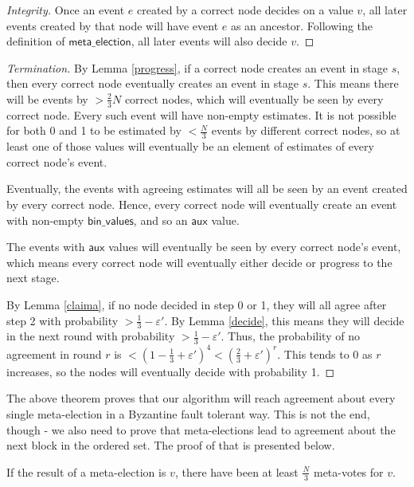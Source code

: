 \documentclass[a4paper,fleqn]{article}
\begin{document}
\begin{proof}[Integrity]
	Once an event $e$ created by a correct node decides on a value $v$, all later events created by
	that node will have event $e$ as an ancestor. Following the definition of
	$\mathsf{meta\_election}$, all later events will also decide $v$.
\end{proof}

\begin{proof}[Termination]
	By Lemma \ref{progress}, if a correct node creates an event in stage $s$, then every correct
	node eventually creates an event in stage $s$. This means there will be events by 
	$> \frac{2}{3}N$ correct nodes, which will eventually be seen by every correct node.  Every
	such event will have non-empty estimates. It is not possible for both 0 and 1 to be estimated
	by $< \frac{N}{3}$ events by different correct nodes, so at least one of those values will
	eventually be an element of estimates of every correct node's event.
	
	Eventually, the events with agreeing estimates will all be seen by an event created by every
	correct node. Hence, every correct node will eventually create an event with non-empty
	$\mathsf{bin\_values}$, and so an $\mathsf{aux}$ value.

	The events with $\mathsf{aux}$ values will eventually be seen by every correct node's event,
	which means every correct node will eventually either decide or progress to the next stage.

	By Lemma \ref{claima}, if no node decided in step 0 or 1, they will all agree after step 2 with
	probability $> \frac{1}{3} - \varepsilon'$. By Lemma \ref{decide}, this means they will decide
	in the next round with probability $> \frac{1}{3} - \varepsilon'$. Thus, the probability of no
	agreement in round $r$ is $< \left( 1 - \frac{1}{3} + \varepsilon' \right)^4 < 
	\left(\frac{2}{3} + \varepsilon'\right)^r$. This tends to 0 as $r$ increases, so the nodes will
	eventually decide with probability 1.
\end{proof}

The above theorem proves that our algorithm will reach agreement about every single meta-election
in a Byzantine fault tolerant way. This is not the end, though - we also need to prove that
meta-elections lead to agreement about the next block in the ordered set. The proof of that is
presented below.

\begin{lem}\label{minvotes}
	If the result of a meta-election is $v$, there have been at least $\frac{N}{3}$ meta-votes for
	$v$.
\end{lem}
\end{document}
